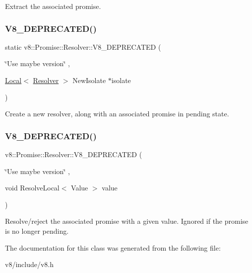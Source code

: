 Extract the associated promise. \mbox{\label{classv8_1_1Promise_1_1Resolver_a67d85fe4756337758692d01f926043cb}} 
\subsubsection{\texorpdfstring{V8\+\_\+\+D\+E\+P\+R\+E\+C\+A\+T\+E\+D()}{V8\_DEPRECATED()}\hspace{0.1cm}{\footnotesize\ttfamily [1/2]}}
{\footnotesize\ttfamily static v8\+::\+Promise\+::\+Resolver\+::\+V8\+\_\+\+D\+E\+P\+R\+E\+C\+A\+T\+ED (\begin{DoxyParamCaption}\item[{\char`\"{}Use maybe version\char`\"{}}]{,  }\item[{\mbox{\hyperlink{classv8_1_1Local}{Local}}$<$ \mbox{\hyperlink{classv8_1_1Promise_1_1Resolver}{Resolver}} $>$ }]{NewIsolate $\ast$isolate }\end{DoxyParamCaption})\hspace{0.3cm}{\ttfamily [static]}}

Create a new resolver, along with an associated promise in pending state. \mbox{\label{classv8_1_1Promise_1_1Resolver_a3e7921685561ad491a43bc6ac5681627}} 
\subsubsection{\texorpdfstring{V8\+\_\+\+D\+E\+P\+R\+E\+C\+A\+T\+E\+D()}{V8\_DEPRECATED()}\hspace{0.1cm}{\footnotesize\ttfamily [2/2]}}
{\footnotesize\ttfamily v8\+::\+Promise\+::\+Resolver\+::\+V8\+\_\+\+D\+E\+P\+R\+E\+C\+A\+T\+ED (\begin{DoxyParamCaption}\item[{\char`\"{}Use maybe version\char`\"{}}]{,  }\item[{void }]{ResolveLocal$<$ Value $>$ value }\end{DoxyParamCaption})}

Resolve/reject the associated promise with a given value. Ignored if the promise is no longer pending. 

The documentation for this class was generated from the following file\+:\begin{DoxyCompactItemize}
\item 
v8/include/v8.\+h\end{DoxyCompactItemize}
